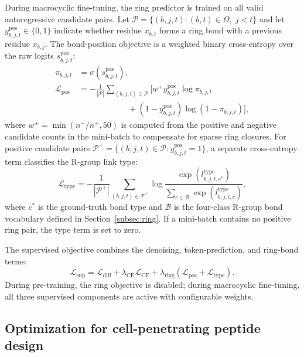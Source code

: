 \begin{methods}
During macrocyclic fine-tuning, the ring predictor is trained on all valid autoregressive candidate pairs.
Let $\mathcal{P}=\{(b,j,t): (b,t)\in\Omega,\; j<t\}$ and let $y_{b,j,t}^{\mathrm{pos}}\in\{0,1\}$ indicate whether residue $x_{b,t}$ forms a ring bond with a previous residue $x_{b,j}$.
The bond-position objective is a weighted binary cross-entropy over the raw logits $s_{b,j,t}^{\mathrm{pos}}$:
\begin{equation}
\begin{aligned}
\pi_{b,j,t} &= \sigma(s_{b,j,t}^{\mathrm{pos}}),\\
\mathcal{L}_{\mathrm{pos}}
&=-\frac{1}{|\mathcal{P}|}
\sum_{(b,j,t)\in\mathcal{P}}
\Big[
w^{+}y_{b,j,t}^{\mathrm{pos}}\log \pi_{b,j,t}\\
&\qquad\qquad\qquad
+(1-y_{b,j,t}^{\mathrm{pos}})\log (1-\pi_{b,j,t})
\Big],
\end{aligned}
\label{eq:pos_loss}
\end{equation}
where $w^{+}=\min(n^{-}/n^{+},50)$ is computed from the positive and negative candidate counts in the mini-batch to compensate for sparse ring closures.
For positive candidate pairs $\mathcal{P}^{+}=\{(b,j,t)\in\mathcal{P}:y_{b,j,t}^{\mathrm{pos}}=1\}$, a separate cross-entropy term classifies the R-group link type:
\begin{equation}
\mathcal{L}_{\mathrm{type}}
=-\frac{1}{|\mathcal{P}^{+}|}
\sum_{(b,j,t)\in\mathcal{P}^{+}}
\log
\frac{\exp(l_{b,j,t,c^{*}}^{\mathrm{type}})}
{\sum_{c\in\mathcal{B}}\exp(l_{b,j,t,c}^{\mathrm{type}})} ,
\label{eq:type_loss}
\end{equation}
where $c^{*}$ is the ground-truth bond type and $\mathcal{B}$ is the four-class R-group bond vocabulary defined in Section~\ref{subsec:ring}.
If a mini-batch contains no positive ring pair, the type term is set to zero.

The supervised objective combines the denoising, token-prediction, and ring-bond terms:
\begin{equation}
\mathcal{L}_{\mathrm{sup}}
=\mathcal{L}_{\mathrm{diff}}
+\lambda_{\mathrm{CE}}\mathcal{L}_{\mathrm{CE}}
+\lambda_{\mathrm{ring}}\left(\mathcal{L}_{\mathrm{pos}}+\mathcal{L}_{\mathrm{type}}\right).
\label{eq:sup_loss}
\end{equation}
During pre-training, the ring objective is disabled; during macrocyclic fine-tuning, all three supervised components are active with configurable weights.

\subsection{Optimization for cell-penetrating peptide design}\label{subsec:preference_optimization}


\end{methods}

